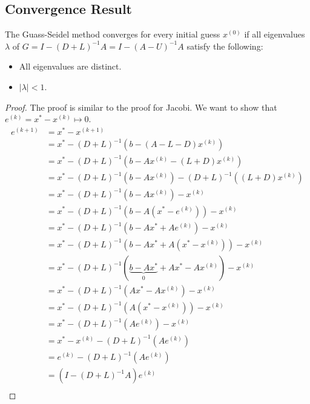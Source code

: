 \documentclass[letterpaper]{article}
\newcommand{\0}{\mathbf{0}}
\begin{document}
\subsection{Convergence Result}
The Guass-Seidel method converges for every initial guess $x^{(0)}$ if all eigenvalues $\lambda$ of $G = I - (D + L)^{-1} A = I - (A - U)^{-1} A$ satisfy the following: 
\begin{itemize}
    \item All eigenvalues are distinct. 
    \item $|\lambda| < 1$. 
\end{itemize}
\begin{proof}
    The proof is similar to the proof for Jacobi. We want to show that $e^{(k)} = x^* - x^{(k)} \mapsto 0$. 
    \begin{equation*}
        \begin{aligned}
            e^{(k + 1)} &= x^{*} - x^{(k + 1)} \\ 
                &= x^* - (D + L)^{-1}(b - (A - L - D)x^{(k)}) \\
                &= x^* - (D + L)^{-1}(b - Ax^{(k)} - (L + D)x^{(k)}) \\  
                &= x^* - (D + L)^{-1}(b - Ax^{(k)}) - (D + L)^{-1}((L + D)x^{(k)}) \\ 
                &= x^* - (D + L)^{-1}(b - Ax^{(k)}) - x^{(k)} \\ 
                &= x^* - (D + L)^{-1}(b - A(x^* - e^{(k)})) - x^{(k)} \\ 
                &= x^* - (D + L)^{-1}(b - Ax^* + Ae^{(k)}) - x^{(k)} \\  
                &= x^* - (D + L)^{-1}(b - Ax^* + A(x^* - x^{(k)})) - x^{(k)} \\ 
                &= x^* - (D + L)^{-1}(\underbrace{b - Ax^*}_{0} + Ax^* - Ax^{(k)}) - x^{(k)} \\ 
                &= x^* - (D + L)^{-1}(Ax^* - Ax^{(k)}) - x^{(k)} \\ 
                &= x^* - (D + L)^{-1}(A(x^* - x^{(k)})) - x^{(k)} \\ 
                &= x^* - (D + L)^{-1}(Ae^{(k)}) - x^{(k)} \\ 
                &= x^* - x^{(k)} - (D + L)^{-1}(Ae^{(k)}) \\ 
                &= e^{(k)} - (D + L)^{-1}(Ae^{(k)}) \\ 
                &= (I - (D + L)^{-1}A) e^{(k)} \\ 
        \end{aligned}

\end{equation*}
\end{proof}
\end{document}
